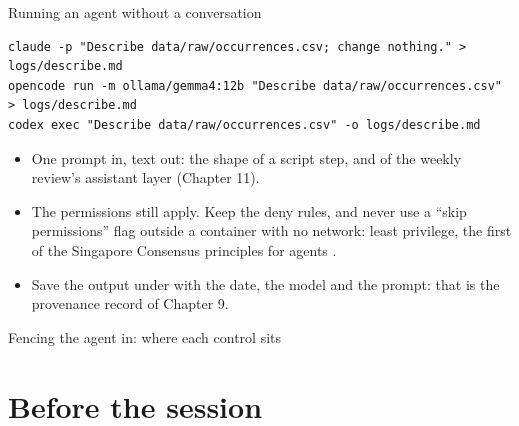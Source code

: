 \documentclass[11pt,aspectratio=169]{beamer}
\begin{document}
\begin{frame}[fragile]{Running an agent without a conversation}
  \begin{lstlisting}[style=shell]
claude -p "Describe data/raw/occurrences.csv; change nothing." > logs/describe.md
opencode run -m ollama/gemma4:12b "Describe data/raw/occurrences.csv" > logs/describe.md
codex exec "Describe data/raw/occurrences.csv" -o logs/describe.md
  \end{lstlisting}
  \begin{itemize}
    \item One prompt in, text out: the shape of a script step, and of the
      weekly review's assistant layer (Chapter 11).
    \item The permissions still apply. Keep the deny rules, and never use a
      ``skip permissions'' flag outside a container with no network: least
      privilege, the first of the Singapore Consensus principles for agents
      \parencite{casper2026singapore}.
    \item Save the output under  with the date, the model and the
      prompt: that is the provenance record of Chapter 9.
  \end{itemize}
\end{frame}

\begin{frame}{Fencing the agent in: where each control sits}
\end{frame}

\section{Before the session}
\end{document}
